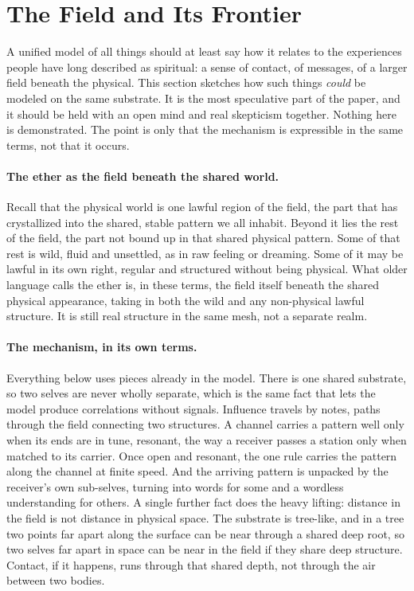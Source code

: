 \section{The Field and Its Frontier}
\label{sec:spiritual}

A unified model of all things should at least say how it relates to the experiences people have
long described as spiritual: a sense of contact, of messages, of a larger field beneath the
physical. This section sketches how such things \emph{could} be modeled on the same substrate.
It is the most speculative part of the paper, and it should be held with an open mind and real
skepticism together. Nothing here is demonstrated. The point is only that the mechanism is
expressible in the same terms, not that it occurs.

\paragraph{The ether as the field beneath the shared world.}
Recall that the physical world is one lawful region of the field, the part that has crystallized
into the shared, stable pattern we all inhabit. Beyond it lies the rest of the field, the part
not bound up in that shared physical pattern. Some of that rest is wild, fluid and unsettled, as
in raw feeling or dreaming. Some of it may be lawful in its own right, regular and structured
without being physical. What older language calls the ether is, in these terms, the field itself
beneath the shared physical appearance, taking in both the wild and any non-physical lawful
structure. It is still real structure in the same mesh, not a separate realm.

\paragraph{The mechanism, in its own terms.}
Everything below uses pieces already in the model. There is one shared substrate, so two selves
are never wholly separate, which is the same fact that lets the model produce correlations
without signals. Influence travels by notes, paths through the field connecting two structures. A channel
carries a pattern well only when its ends are in tune, resonant, the way a receiver passes a
station only when matched to its carrier. Once open and resonant, the one rule carries the pattern
along the channel at finite speed. And the arriving pattern is unpacked by the receiver's own
sub-selves, turning into words for some and a wordless understanding for others. A single further
fact does the heavy lifting: distance in the field is not distance in physical space. The
substrate is tree-like, and in a tree two points far apart along the surface can be near through a
shared deep root, so two selves far apart in space can be near in the field if they share deep
structure. Contact, if it happens, runs through that shared depth, not through the air between two
bodies.

